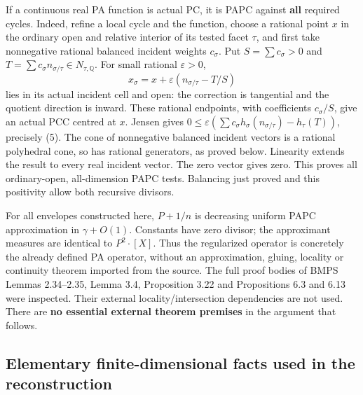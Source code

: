 \documentclass[
  11pt,
]{article}
\begin{document}
If a continuous real PA function is actual PC, it is PAPC against
\textbf{all} required cycles. Indeed, refine a local cycle and the
function, choose a rational point \(x\) in the ordinary open and
relative interior of its tested facet \(\tau\), and first take
nonnegative rational balanced incident weights \(c_\sigma\). Put
\(S=\sum c_\sigma>0\) and
\(T=\sum c_\sigma n_{\sigma/\tau}\in N_{\tau,\mathbb{Q}}\). For small
rational \(\varepsilon>0\), \[
 x_\sigma=x+\varepsilon(n_{\sigma/\tau}-T/S)
\] lies in its actual incident cell and open: the correction is
tangential and the quotient direction is inward. These rational
endpoints, with coefficients \(c_\sigma/S\), give an actual PCC centred
at \(x\). Jensen gives
\(0\leq\varepsilon(\sum c_\sigma h_\sigma(n_{\sigma/\tau})-h_\tau(T))\),
precisely (5). The cone of nonnegative balanced incident vectors is a
rational polyhedral cone, so has rational generators, as proved below.
Linearity extends the result to every real incident vector. The zero
vector gives zero. This proves all ordinary-open, all-dimension PAPC
tests. Balancing just proved and this positivity allow both recursive
divisors.

For all envelopes constructed here, \(P+1/n\) is decreasing uniform PAPC
approximation in \(\gamma+O(1)\). Constants have zero divisor; the
approximant measures are identical to \(P^2\cdot[X]\). Thus the
regularized operator is concretely the already defined PA operator,
without an approximation, gluing, locality or continuity theorem
imported from the source. The full proof bodies of BMPS Lemmas
2.34--2.35, Lemma 3.4, Proposition 3.22 and Propositions 6.3 and 6.13
were inspected. Their external locality/intersection dependencies are
not used. There are \textbf{no essential external theorem premises} in
the argument that follows.

\subsection{Elementary finite-dimensional facts used in the
reconstruction}\label{elementary-finite-dimensional-facts-used-in-the-reconstruction}
\end{document}
